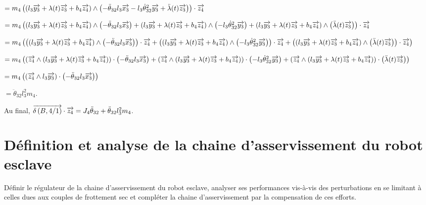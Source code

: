 \documentclass[10pt,fleqn]{article} %
\begin{document}
$= m_4\left( \left(l_3 \overrightarrow{y_3} + \lambda(t) \overrightarrow{z_3}+ b_4 \overrightarrow{z_4}\right) \wedge  \left(-\ddot{\theta}_{32}l_3\overrightarrow{x_3} -l_3   \dot{\theta}_{32}^2  \overrightarrow{y_3} + \ddot{\lambda}(t)\overrightarrow{z_3} \right) \right)\cdot \overrightarrow{z_4}$

$= m_4\left( \left(l_3 \overrightarrow{y_3} + \lambda(t) \overrightarrow{z_3}+ b_4 \overrightarrow{z_4}\right) \wedge  \left(-\ddot{\theta}_{32}l_3\overrightarrow{x_3}\right)  + \left(l_3 \overrightarrow{y_3} + \lambda(t) \overrightarrow{z_3}+ b_4 \overrightarrow{z_4}\right) \wedge  \left(-l_3   \dot{\theta}_{32}^2  \overrightarrow{y_3}\right) + \left(l_3 \overrightarrow{y_3} + \lambda(t) \overrightarrow{z_3}+ b_4 \overrightarrow{z_4}\right) \wedge  \left(\ddot{\lambda}(t)\overrightarrow{z_3}\right) \right) \cdot \overrightarrow{z_4}$

$= m_4\left(\left( \left(l_3 \overrightarrow{y_3} + \lambda(t) \overrightarrow{z_3}+ b_4 \overrightarrow{z_4}\right) \wedge  \left(-\ddot{\theta}_{32}l_3\overrightarrow{x_3}\right) \right) \cdot \overrightarrow{z_4} 
 + \left(\left(l_3 \overrightarrow{y_3} + \lambda(t) \overrightarrow{z_3}+ b_4 \overrightarrow{z_4}\right) \wedge  \left(-l_3   \dot{\theta}_{32}^2  \overrightarrow{y_3}\right)\right) \cdot \overrightarrow{z_4}
  +\left( \left(l_3 \overrightarrow{y_3} + \lambda(t) \overrightarrow{z_3}+ b_4 \overrightarrow{z_4}\right) \wedge  \left(\ddot{\lambda}(t)\overrightarrow{z_3}\right) \right) \cdot \overrightarrow{z_4}\right)$
  
$= m_4\left(\left( \overrightarrow{z_4} \wedge  \left(l_3 \overrightarrow{y_3} + \lambda(t) \overrightarrow{z_3}+ b_4 \overrightarrow{z_4}\right)  \right) \cdot  \left(-\ddot{\theta}_{32}l_3\overrightarrow{x_3}\right)
 + \left(\overrightarrow{z_4} \wedge \left(l_3 \overrightarrow{y_3} + \lambda(t) \overrightarrow{z_3}+ b_4 \overrightarrow{z_4}\right)  \right) \cdot \left(-l_3   \dot{\theta}_{32}^2  \overrightarrow{y_3}\right)
  +\left( \overrightarrow{z_4} \wedge \left(l_3 \overrightarrow{y_3} + \lambda(t) \overrightarrow{z_3}+ b_4 \overrightarrow{z_4}\right) \right) \cdot   \left(\ddot{\lambda}(t)\overrightarrow{z_3}\right) \right)$
  
  $= m_4\left(\left( \overrightarrow{z_4} \wedge  l_3 \overrightarrow{y_3}  \right) \cdot  \left(-\ddot{\theta}_{32}l_3\overrightarrow{x_3}\right)   \right)$

  $= \ddot{\theta}_{32}l_3^2 m_4 $.
  
  Au final,  $\overrightarrow{\delta \left( {B}, {4} /{1}\right)}\cdot\overrightarrow{z_4} = J_4 \ddot{\theta}_{32}+\ddot{\theta}_{32}l_3^2 m_4 $.


\subparagraph{}%

\subparagraph{}%

\subparagraph{}%

\section{Définition et analyse de la chaine d’asservissement du robot esclave}
\begin{obj}
Définir le régulateur de la chaine d’asservissement du robot esclave, analyser ses performances vis-à-vis
des perturbations en se limitant à celles dues aux couples de frottement sec et compléter la chaine
d’asservissement par la compensation de ces efforts.
\end{obj}
\end{document}
